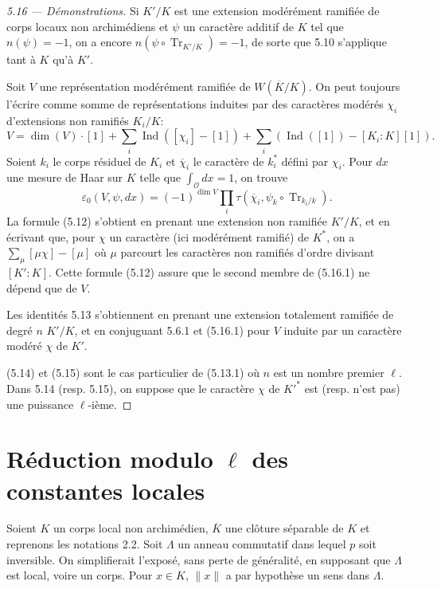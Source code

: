 \documentclass[11pt]{amsart}
\theoremstyle{plain}
\theoremstyle{definition}
\DeclareMathOperator{\Ind}{Ind}
\begin{document}
\begin{proof}[5.16 --- D\'emonstrations]
Si $K'/K$ est une extension mod\'er\'ement ramifi\'ee de corps locaux non archim\'ediens et $\psi$ un caract\`ere additif de $K$ tel que $n(\psi) = -1$, on a encore $n(\psi \circ \operatorname{Tr}_{K'/K}) = -1$, de sorte que 5.10 s'applique tant \`a $K$ qu'\`a $K'$.

Soit $V$ une repr\'esentation mod\'er\'ement ramifi\'ee de $W(\overline{K}/K)$. On peut toujours l'\'ecrire comme somme de repr\'esentations induites par des caract\`eres mod\'er\'es $\chi_i$ d'extensions non ramifi\'es $K_i/K$:
\[
V = \dim(V) \cdot [1] + \sum_i \Ind([\chi_i] - [1]) + \sum_i (\Ind([1]) - [K_i:K][1]).
\]
Soient $k_i$ le corps r\'esiduel de $K_i$ et $\overline{\chi}_i$ le caract\`ere de $k_i^*$ d\'efini par $\chi_i$. Pour $dx$ une mesure de Haar sur $K$ telle que $\int_{\mathcal{O}} dx = 1$, on trouve
\begin{equation}
\varepsilon_0(V,\psi,dx) = (-1)^{\dim V} \prod_i \tau(\overline{\chi}_i, \psi_k \circ \operatorname{Tr}_{k_i/k}).
\tag{5.16.1}
\end{equation}
La formule (5.12) s'obtient en prenant une extension non ramifi\'ee $K'/K$, et en \'ecrivant que, pour $\chi$ un caract\`ere (ici mod\'er\'ement ramifi\'e) de $K^*$, on a $\sum_{\mu} [\mu\chi] - [\mu]$ o\`u $\mu$ parcourt les caract\`eres non ramifi\'es d'ordre divisant $[K':K]$. Cette formule (5.12) assure que le second membre de (5.16.1) ne d\'epend que de $V$.

Les identit\'es 5.13 s'obtiennent en prenant une extension totalement ramifi\'ee de degr\'e $n$ $K'/K$, et en conjuguant 5.6.1 et (5.16.1) pour $V$ induite par un caract\`ere mod\'er\'e $\chi$ de $K'$.

(5.14) et (5.15) sont le cas particulier de (5.13.1) o\`u $n$ est un nombre premier $\ell$. Dans 5.14 (resp. 5.15), on suppose que le caract\`ere $\chi$ de $K'^*$ est (resp. n'est pas) une puissance $\ell$-i\`eme.
\end{proof}

\section{R\'eduction modulo $\ell$ des constantes locales}

Soient $K$ un corps local non archim\'edien, $\overline{K}$ une cl\^oture s\'eparable de $K$ et reprenons les notations 2.2. Soit $\Lambda$ un anneau commutatif dans lequel $p$ soit inversible. On simplifierait l'expos\'e, sans perte de g\'en\'eralit\'e, en supposant que $\Lambda$ est local, voire un corps. Pour $x \in K$, $\|x\|$ a par hypoth\`ese un sens dans $\Lambda$.
\end{document}
